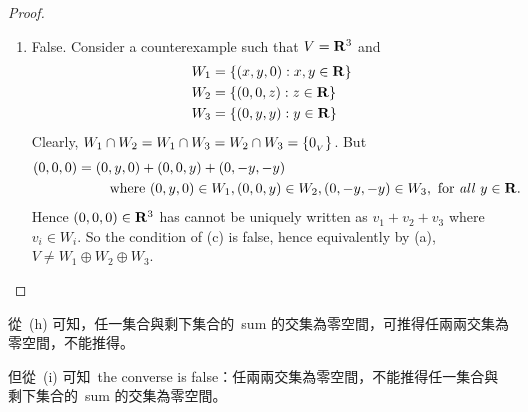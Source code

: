 \begin{proof}
\begin{enumerate}
\item False.
Consider a counterexample such that \(V = \mathbf{R}^3\) and
\begin{align*}
    W_1 & = \{ (x, y, 0) : x, y \in \mathbf{R} \} \\
    W_2 & = \{ (0, 0, z) : z \in \mathbf{R} \} \\
    W_3 & = \{ (0, y, y) : y \in \mathbf{R} \}
\end{align*}
Clearly, \(W_1 \cap W_2 = W_1 \cap W_3 = W_2 \cap W_3 = \{ 0_{_V} \}\).
But
\begin{align*}
    (0, 0, 0) & = (0, y, 0) + (0, 0, y) + (0, -y, -y) \\
    & \quad \quad \text{ where } (0, y, 0) \in W_1, (0, 0, y) \in W_2, (0, -y, -y) \in W_3, \text{ for \emph{all} } y \in \mathbf{R}.
\end{align*}
Hence \((0, 0, 0) \in \mathbf{R}^3\) has cannot be uniquely written as \(v_1 + v_2 + v_3\) where \(v_i \in W_i\).
So the condition of (c) is false, hence equivalently by (a), \(V \ne W_1 \oplus W_2 \oplus W_3\).
\end{enumerate}
\end{proof}

\begin{note}
從\ (h) 可知，任一集合與剩下集合的\ sum 的交集為零空間，可推得任兩兩交集為零空間，不能推得。

但從\ (i) 可知\ the converse is false：任兩兩交集為零空間，不能推得任一集合與剩下集合的\ sum 的交集為零空間。
\end{note}


